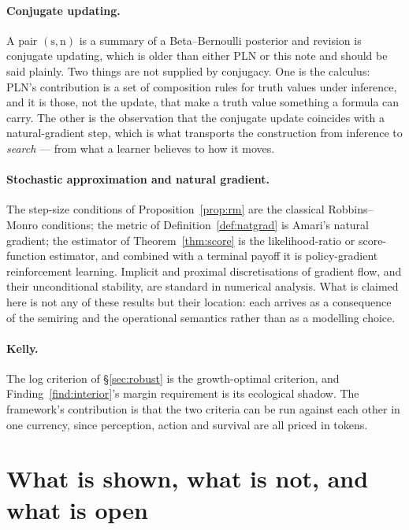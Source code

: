\documentclass[11pt,a4paper]{article}
\theoremstyle{plain}
\theoremstyle{definition}
\theoremstyle{remark}
\newcommand{\str}{\mathrm{s}}
\newcommand{\ev}{\mathrm{n}}
\begin{document}
\paragraph{Conjugate updating.} A pair $(\str,\ev)$ is a summary of a
Beta--Bernoulli posterior and revision is conjugate updating, which is older than
either PLN or this note and should be said plainly. Two things are not supplied
by conjugacy. One is the calculus: PLN's contribution is a set of composition
rules for truth values under inference, and it is those, not the update, that make
a truth value something a formula can carry. The other is the observation that
the conjugate update coincides with a natural-gradient step, which is what
transports the construction from inference to \emph{search} --- from what a
learner believes to how it moves.

\paragraph{Stochastic approximation and natural gradient.} The step-size
conditions of Proposition~\ref{prop:rm} are the classical Robbins--Monro
conditions; the metric of Definition~\ref{def:natgrad} is Amari's natural
gradient; the estimator of Theorem~\ref{thm:score} is the likelihood-ratio or
score-function estimator, and combined with a terminal payoff it is
policy-gradient reinforcement learning. Implicit and proximal discretisations of
gradient flow, and their unconditional stability, are standard in numerical
analysis. What is claimed here is not any of these results but their location:
each arrives as a consequence of the semiring and the operational semantics
rather than as a modelling choice.

\paragraph{Kelly.} The log criterion of \S\ref{sec:robust} is the growth-optimal
criterion, and Finding~\ref{find:interior}'s margin requirement is its ecological
shadow. The framework's contribution is that the two criteria can be run against
each other in one currency, since perception, action and survival are all priced
in tokens.

\section{What is shown, what is not, and what is open}\label{sec:status}
\end{document}
